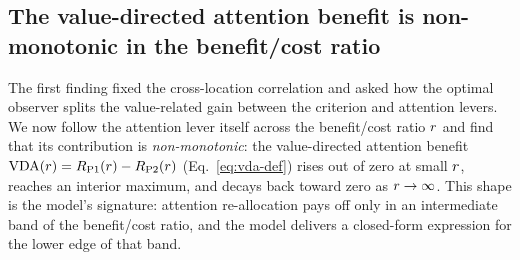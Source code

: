 \subsection{The value-directed attention benefit is non-monotonic in
            the benefit/cost ratio}
\label{sec:results-vda-nonmonotonic}

The first finding fixed the cross-location correlation and asked how the
optimal observer splits the value-related gain between the criterion and
attention levers. We now follow the attention lever itself across the
benefit/cost ratio $r$ and find that its contribution is
\emph{non-monotonic}: the value-directed attention benefit
$\mathrm{VDA}(r) = R_{\mathrm{P1}}(r) - R_{\mathrm{P2}}(r)$
(Eq.~\ref{eq:vda-def}) rises out of zero at small $r$, reaches an
interior maximum, and decays back toward zero as $r \to \infty$.
This shape is the model's signature: attention re-allocation pays off
only in an intermediate band of the benefit/cost ratio, and the model
delivers a closed-form expression for the lower edge of that band.

